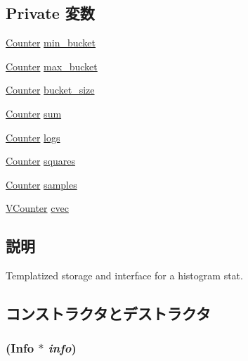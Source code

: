 \subsection*{Private 変数}
\begin{DoxyCompactItemize}
\item 
\hyperlink{namespaceStats_ac35128c026c72bb36af9cea00774e8a6}{Counter} \hyperlink{classStats_1_1HistStor_a9d864ebe1be0714ea4599a5d4e52404d}{min\_\-bucket}
\item 
\hyperlink{namespaceStats_ac35128c026c72bb36af9cea00774e8a6}{Counter} \hyperlink{classStats_1_1HistStor_aed6ecbe61a17b3a0ef319655805a77d9}{max\_\-bucket}
\item 
\hyperlink{namespaceStats_ac35128c026c72bb36af9cea00774e8a6}{Counter} \hyperlink{classStats_1_1HistStor_acf3483d9fb89e37ad01724a4428b3dd2}{bucket\_\-size}
\item 
\hyperlink{namespaceStats_ac35128c026c72bb36af9cea00774e8a6}{Counter} \hyperlink{classStats_1_1HistStor_ab5b201cce7e10c48f62b71605e75707e}{sum}
\item 
\hyperlink{namespaceStats_ac35128c026c72bb36af9cea00774e8a6}{Counter} \hyperlink{classStats_1_1HistStor_a8bbd10a9b5009b4ca5f2709c9dfcb684}{logs}
\item 
\hyperlink{namespaceStats_ac35128c026c72bb36af9cea00774e8a6}{Counter} \hyperlink{classStats_1_1HistStor_a0c02ec1e072d692448ce4429a78e3675}{squares}
\item 
\hyperlink{namespaceStats_ac35128c026c72bb36af9cea00774e8a6}{Counter} \hyperlink{classStats_1_1HistStor_ab4db99aba3dd28686061dd3d5475b3bd}{samples}
\item 
\hyperlink{classstd_1_1vector}{VCounter} \hyperlink{classStats_1_1HistStor_a8cc2f3a565a2e54ab797f717802bc894}{cvec}
\end{DoxyCompactItemize}


\subsection{説明}
Templatized storage and interface for a histogram stat. 

\subsection{コンストラクタとデストラクタ}
\hypertarget{classStats_1_1HistStor_afc7195eb3d179716c9c440eed73460fb}{
\subsubsection[{HistStor}]{ ({\bf Info} $\ast$ {\em info})}}
\label{classStats_1_1HistStor_afc7195eb3d179716c9c440eed73460fb}



